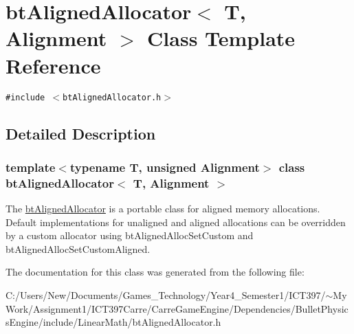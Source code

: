 \hypertarget{classbt_aligned_allocator}{
\section{btAlignedAllocator$<$ T, Alignment $>$ Class Template Reference}
\label{classbt_aligned_allocator}
}
{\tt \#include $<$btAlignedAllocator.h$>$}



\subsection{Detailed Description}
\subsubsection*{template$<$typename T, unsigned Alignment$>$ class btAlignedAllocator$<$ T, Alignment $>$}

The \hyperlink{classbt_aligned_allocator}{btAlignedAllocator} is a portable class for aligned memory allocations. Default implementations for unaligned and aligned allocations can be overridden by a custom allocator using btAlignedAllocSetCustom and btAlignedAllocSetCustomAligned. 

The documentation for this class was generated from the following file:\begin{CompactItemize}
\item 
C:/Users/New/Documents/Games\_\-Technology/Year4\_\-Semester1/ICT397/$\sim$My Work/Assignment1/ICT397Carre/CarreGameEngine/Dependencies/BulletPhysicsEngine/include/LinearMath/btAlignedAllocator.h\end{CompactItemize}
